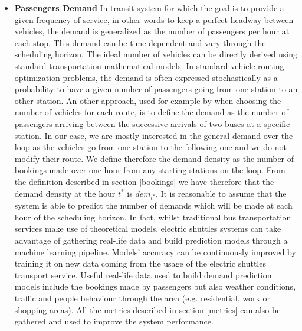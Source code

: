 \documentclass[12pt,a4paper]{article}
\begin{document}
\begin{itemize}
\setlength\itemsep{1pt}
\item \textbf{Passengers Demand} In transit system for which the goal is to provide a given frequency of service, in other words to keep a perfect headway between vehicles, the demand is generalized as the number of passengers per hour at each stop. This demand can be time-dependent and vary through the scheduling horizon. The ideal number of vehicles can be directly derived using standard transportation mathematical models. In standard vehicle routing optimization problems, the demand is often expressed stochastically as a probability to have a given number of passengers going from one station to an other station. An other approach, used for example by \cite{ga} when choosing the number of vehicles for each route, is to define the demand as the number of passengers arriving between the successive arrivals of two buses at a specific station. In our case, we are mostly interested in the general demand over the loop as the vehicles go from one station to the following one and we do not modify their route. We define therefore the demand density as the number of bookings made over one hour from any starting stations on the loop. From the definition described in section \ref{bookings} we have therefore that the demand density at the hour $t^{*}$ is $dem_{t^{*}}$. It is reasonable to assume that the system is able to predict the number of demands which will be made at each hour of the scheduling horizon. In fact, whilst traditional bus transportation services make use of theoretical models, electric shuttles systems can take advantage of gathering real-life data and build prediction models through a machine learning pipeline. Models' accuracy can be continuously improved by training it on new data coming from the usage of the electric shuttles transport service. Useful real-life data used to build demand prediction models include the bookings made by passengers but also weather conditions, traffic and people behaviour through the area (e.g. residential, work or shopping areas). All the metrics described in section \ref{metrics} can also be gathered and used to improve the system performance.

\end{itemize}
\end{document}
